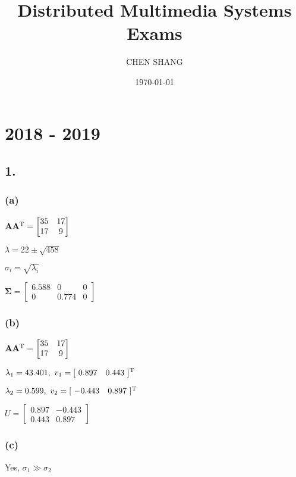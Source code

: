 \documentclass{article}
\title{Distributed Multimedia Systems Exams}
\author{CHEN SHANG }
\date{\today}
\begin{document}
\maketitle
\large


\section*{2018 - 2019}
\subsection*{1.}
\subsubsection*{(a)}
$\mathbf{A}\mathbf{A}^{\rm T}=\begin{bmatrix}
35 &17 \\
17  &9
\end{bmatrix}$\par\indent
\par
$\lambda=22\pm \sqrt{458}$\par
$\sigma_{i}=\sqrt{\lambda_{i}}$\par\indent
\par
$\mathbf{\Sigma}=\begin{bmatrix}
6.588 &0 &0 \\
0  &0.774 &0
\end{bmatrix}$

\subsubsection*{(b)}
$\mathbf{A}\mathbf{A}^{\rm T}=\begin{bmatrix}
35 &17 \\
17  &9
\end{bmatrix}$\par\indent
\par
$\lambda_{1}=43.401, \ v_{1}=[ \ 0.897 \quad 0.443 \ ]^{\rm T}$\par
$\lambda_{2}=0.599, \ v_{2}=[ \ -0.443 \quad 0.897 \ ]^{\rm T}$\par\indent
\par
$U=\begin{bmatrix}
0.897 &-0.443 \\
0.443  &0.897
\end{bmatrix}$
\subsubsection*{(c)}
Yes, $\sigma_{1} \gg \sigma_{2}$
\end{document}
